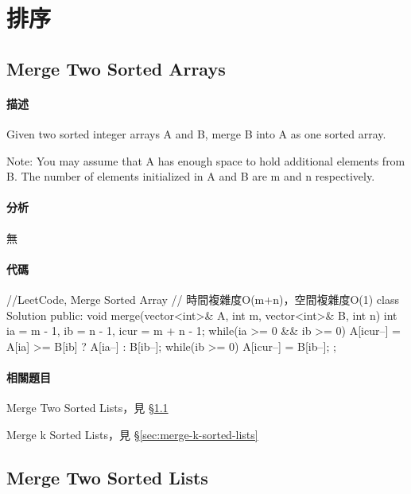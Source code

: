 \chapter{排序}

\section{Merge Two Sorted Arrays} %
\label{sec:merge-two-sorted-arrays}


\subsubsection{描述}
Given two sorted integer arrays A and B, merge B into A as one sorted array.

Note:
You may assume that A has enough space to hold additional elements from B. The number of elements initialized in A and B are m and n respectively.


\subsubsection{分析}
無


\subsubsection{代碼}
\begin{Code}
//LeetCode, Merge Sorted Array
// 時間複雜度O(m+n)，空間複雜度O(1)
class Solution {
public:
    void merge(vector<int>& A, int m, vector<int>& B, int n) {
        int ia = m - 1, ib = n - 1, icur = m + n - 1;
        while(ia >= 0 && ib >= 0) {
            A[icur--] = A[ia] >= B[ib] ? A[ia--] : B[ib--];
        }
        while(ib >= 0) {
            A[icur--] = B[ib--];
        }
    }
};
\end{Code}


\subsubsection{相關題目}
\begindot
\item Merge Two Sorted Lists，見 \S \ref{sec:merge-two-sorted-arrays}
\item Merge k Sorted Lists，見 \S \ref{sec:merge-k-sorted-lists}
\myenddot


\section{Merge Two Sorted Lists} %
\label{sec:merge-two-sorted-lists}


